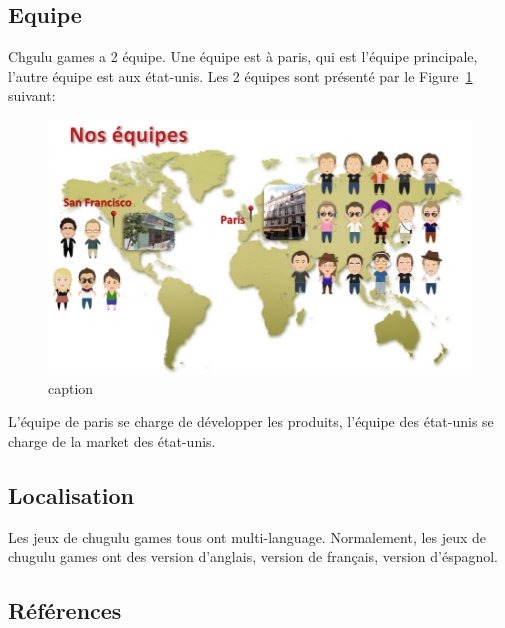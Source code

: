 
\subsection{Equipe} %
\label{sub:subsection_name}

Chgulu games a 2 équipe. Une équipe est à paris, qui est l'équipe principale, l'autre équipe est aux état-unis. Les 2 équipes sont présenté par le Figure~\ref{fig:Image_EquipeChugulu} suivant:

\begin{figure}[htbp]
	\centering
		\includegraphics[width=6in]{Image/EquipeChugulu.png}
	\caption{caption}
	\label{fig:Image_EquipeChugulu}
\end{figure}



L'équipe de paris se charge de développer les produits, l'équipe des état-unis se charge de la market des état-unis. 


\subsection{Localisation} %
\label{ssub:subsubsection_name}

Les jeux de chugulu games tous ont multi-language. Normalement, les jeux de chugulu games ont des version d'anglais, version de français, version d'éspagnol. 


\subsection{Références} %
\label{ssub:références}

